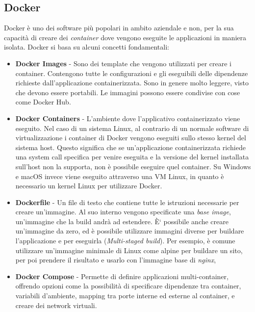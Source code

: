 \subsection{Docker}
Docker \`e uno dei software pi\`u popolari in ambito aziendale e non, per la sua capacit\`a di creare dei \textit{container} dove vengono eseguite le applicazioni in maniera isolata.
Docker si basa su alcuni concetti fondamentali:
\begin{itemize}
  \item \textbf{Docker Images} - Sono dei template che vengono utilizzati per creare i container. Contengono tutte le configurazioni e gli eseguibili delle dipendenze richieste
    dall'applicazione containerizzata. Sono in genere molto leggere, visto che devono essere portabili. Le immagini possono essere condivise con cose come Docker Hub.
  \item \textbf{Docker Containers} - L'ambiente dove l'applicativo containerizzato viene eseguito. Nel caso di un sistema Linux, al contrario di un normale software di virtualizzazione
    i container di Docker vengono eseguiti sullo stesso kernel del sistema host. Questo significa che se un'applicazione containerizzata richiede una system call specifica
    per venire eseguita e la versione del kernel installata sull'host non la supporta, non \`e possibile eseguire quel container. Su Windows e macOS invece viene eseguito
    attraverso una VM Linux, in quanto \`e necessario un kernel Linux per utilizzare Docker.
  \item \textbf{Dockerfile} - Un file di testo che contiene tutte le istruzioni necessarie per creare un'immagine. Al suo interno vengono specificate una \textit{base image},
    un'immagine che la build andr\`a ad estendere. \`E` possibile anche creare un'immagine da zero, ed \`e possibile utilizzare immagini diverse per buildare l'applicazione e per eseguirla
    (\textit{Multi-staged build}). Per esempio, \`e comune utilizzare un'immagine minimale di Linux come alpine per buildare un sito, per poi prendere il risultato e usarlo con
    l'immagine base di \textit{nginx},
  \item \textbf{Docker Compose} - Permette di definire applicazioni multi-container, offrendo opzioni come la possibilit\`a di specificare dipendenze tra container, variabili d'ambiente,
    mapping tra porte interne ed esterne al container, e creare dei network virtuali.
\end{itemize}

